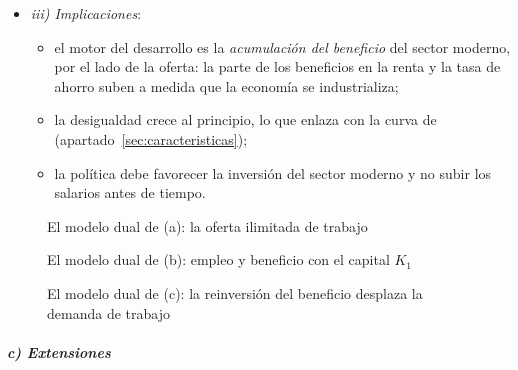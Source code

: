 \documentclass[11pt]{article}
\begin{document}
\begin{itemize}
\item \emph{iii) Implicaciones}:
  \begin{itemize}
  \item el motor del desarrollo es la \emph{acumulación del beneficio} del sector moderno, por el lado de la oferta: la parte de los beneficios en la renta y la tasa de ahorro suben a medida que la economía se industrializa;
  \item la desigualdad crece al principio, lo que enlaza con la curva de  (apartado~\ref{sec:caracteristicas});
  \item la política debe favorecer la inversión del sector moderno y no subir los salarios antes de tiempo.
  \end{itemize}
\end{itemize}

\begin{figure}[H]
\centering
\caption{El modelo dual de  (a): la oferta ilimitada de trabajo}\label{fig:lewis-a}
\end{figure}

\begin{figure}[H]
\centering
\caption{El modelo dual de  (b): empleo y beneficio con el capital $K_1$}\label{fig:lewis-b}
\end{figure}

\begin{figure}[H]
\centering
\caption{El modelo dual de  (c): la reinversión del beneficio desplaza la demanda de trabajo}\label{fig:lewis}
\end{figure}


\subparagraph{c) Extensiones}
\end{document}
